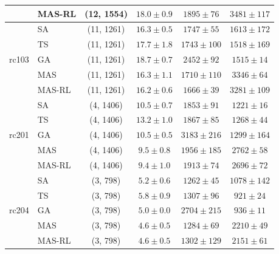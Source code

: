 {\begin{longtable}{llcccc}
 & MAS-RL & (12, 1554) & $18.0 \pm 0.9$ & $1895 \pm 76$ & $3481 \pm 117$ \\
\midrule
\multirow{5}{*}{rc103} & SA & (11, 1261) & $16.3 \pm 0.5$ & $1747 \pm 55$ & $1613 \pm 172$ \\*
 & TS & (11, 1261) & $17.7 \pm 1.8$ & $1743 \pm 100$ & $1518 \pm 169$ \\*
 & GA & (11, 1261) & $18.7 \pm 0.7$ & $2452 \pm 92$ & $1515 \pm 14$ \\*
 & MAS & (11, 1261) & $16.3 \pm 1.1$ & $1710 \pm 110$ & $3346 \pm 64$ \\*
 & MAS-RL & (11, 1261) & $16.2 \pm 0.6$ & $1666 \pm 39$ & $3281 \pm 109$ \\
\midrule
\multirow{5}{*}{rc201} & SA & (4, 1406) & $10.5 \pm 0.7$ & $1853 \pm 91$ & $1221 \pm 16$ \\*
 & TS & (4, 1406) & $13.2 \pm 1.0$ & $1867 \pm 85$ & $1268 \pm 44$ \\*
 & GA & (4, 1406) & $10.5 \pm 0.5$ & $3183 \pm 216$ & $1299 \pm 164$ \\*
 & MAS & (4, 1406) & $9.5 \pm 0.8$ & $1956 \pm 185$ & $2762 \pm 58$ \\*
 & MAS-RL & (4, 1406) & $9.4 \pm 1.0$ & $1913 \pm 74$ & $2696 \pm 72$ \\
\midrule
\multirow{5}{*}{rc204} & SA & (3, 798) & $5.2 \pm 0.6$ & $1262 \pm 45$ & $1078 \pm 142$ \\*
 & TS & (3, 798) & $5.8 \pm 0.9$ & $1307 \pm 96$ & $921 \pm 24$ \\*
 & GA & (3, 798) & $5.0 \pm 0.0$ & $2704 \pm 215$ & $936 \pm 11$ \\*
 & MAS & (3, 798) & $4.6 \pm 0.5$ & $1284 \pm 69$ & $2210 \pm 49$ \\*
 & MAS-RL & (3, 798) & $4.6 \pm 0.5$ & $1302 \pm 129$ & $2151 \pm 61$ \\
\end{longtable}
}